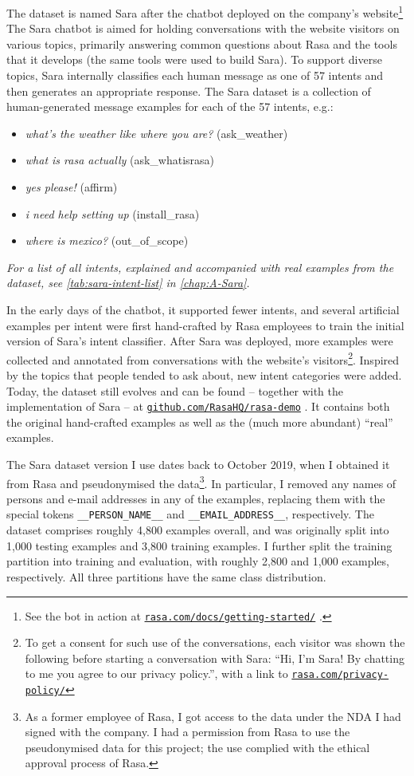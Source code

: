 \documentclass[bsc,frontabs,singlespacing,parskip,deptreport]{infthesis}
\newcommand\rurl[1]{%
  \href{https://#1}{\nolinkurl{#1}}%
}
\begin{document}
{{{      The dataset is named Sara after the chatbot deployed on the company's website\footnote{See the bot in action at \rurl{rasa.com/docs/getting-started/}.}
      The Sara chatbot is aimed for holding conversations with the website visitors on various topics, primarily answering common questions about Rasa and the tools that it develops (the same tools were used to build Sara).
      To support diverse topics, Sara internally classifies each human message as one of 57 intents and then generates an appropriate response. The Sara dataset is a collection of human-generated message examples for each of the 57 intents, e.g.:
      \begin{itemize}
        \item \textit{what's the weather like where you are?} (ask\_weather)
        \item \textit{what is rasa actually} (ask\_whatisrasa)
        \item \textit{yes please!} (affirm)
        \item \textit{i need help setting up} (install\_rasa)
        \item \textit{where is mexico?} (out\_of\_scope)
      \end{itemize}
      \textit{For a list of all intents, explained and accompanied with real examples from the dataset, see \autoref{tab:sara-intent-list} in \autoref{chap:A-Sara}.}

      In the early days of the chatbot, it supported fewer intents, and several artificial examples per intent were first hand-crafted by Rasa employees to train the initial version of Sara's intent classifier. After Sara was deployed, more examples were collected and annotated from conversations with the website's visitors\footnote{To get a consent for such use of the conversations, each visitor was shown the following before starting a conversation with Sara: ``Hi, I'm Sara! By chatting to me you agree to our privacy policy.'', with a link to \rurl{rasa.com/privacy-policy/}}. Inspired by the topics that people tended to ask about, new intent categories were added. Today, the dataset still evolves and can be found -- together with the implementation of Sara -- at \rurl{github.com/RasaHQ/rasa-demo}. It contains both the original hand-crafted examples as well as the (much more abundant) ``real'' examples.

      The Sara dataset version I use dates back to October 2019, when I obtained it from Rasa and pseudonymised the data\footnote{As a former employee of Rasa, I got access to the data under the NDA I had signed with the company. I had a permission from Rasa to use the pseudonymised data for this project; the use complied with the ethical approval process of Rasa.}. In particular, I removed any names of persons and e-mail addresses in any of the examples, replacing them with the special tokens \verb|__PERSON_NAME__| and \verb|__EMAIL_ADDRESS__|, respectively.      
      The dataset comprises roughly 4,800 examples overall, and was originally split into 1,000 testing examples and 3,800 training examples. 
      I further split the training partition into training and evaluation, with roughly 2,800 and 1,000 examples, respectively. All three partitions have the same class distribution.

}}}
\end{document}
